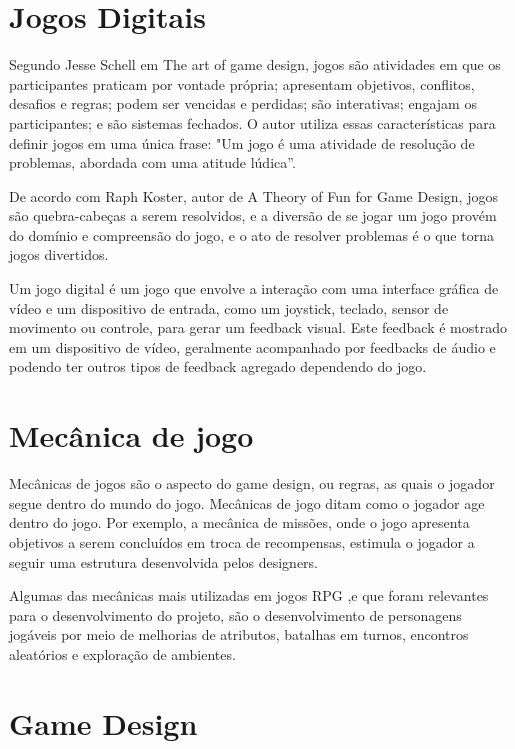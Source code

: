\section{Jogos Digitais}

Segundo Jesse Schell em The art of game design, jogos são atividades em que os participantes praticam por vontade própria; apresentam objetivos, conflitos, desafios e regras; podem ser vencidas e perdidas; são interativas; engajam os participantes; e são sistemas fechados. O autor utiliza essas características para definir jogos em uma única frase: "Um jogo é uma atividade de resolução de problemas, abordada com uma atitude lúdica”.~\cite{TheArt}

De acordo com Raph Koster, autor de A Theory of Fun for Game Design, jogos são quebra-cabeças a serem resolvidos, e a diversão de se jogar um jogo provém do domínio e compreensão do jogo, e o ato de resolver problemas é o que torna jogos divertidos.~\cite{TheFun}

Um jogo digital é um jogo que envolve a interação com uma interface gráfica de vídeo e um dispositivo de entrada, como um joystick, teclado, sensor de movimento ou controle, para gerar um feedback visual. Este feedback é mostrado em um dispositivo de vídeo, geralmente acompanhado por feedbacks de áudio e podendo ter outros tipos de feedback agregado dependendo do jogo.~\cite{Wiki02}

\section{Mecânica de jogo}

Mecânicas de jogos são o aspecto do game design, ou regras, as quais o jogador segue dentro do mundo do jogo. Mecânicas de jogo ditam como o jogador age dentro do jogo. Por exemplo, a mecânica de missões, onde o jogo apresenta objetivos a serem concluídos em troca de recompensas, estimula o jogador a seguir uma estrutura desenvolvida pelos designers.~\cite{GD:2021}

Algumas das mecânicas mais utilizadas em jogos RPG ,e que foram relevantes para o desenvolvimento do projeto, são o desenvolvimento de personagens jogáveis por meio de melhorias de atributos, batalhas em turnos, encontros aleatórios e exploração de ambientes.

\section{Game Design}


